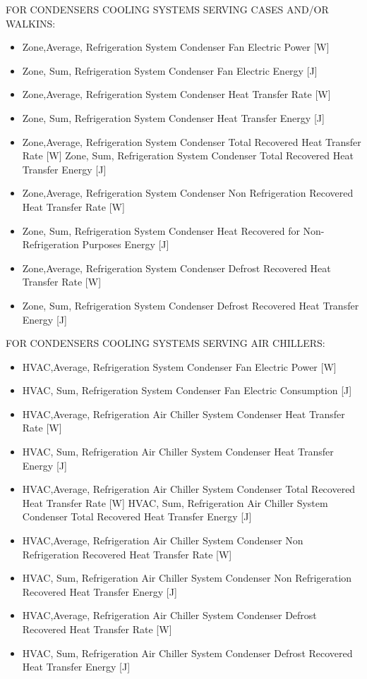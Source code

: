 FOR CONDENSERS COOLING SYSTEMS SERVING CASES AND/OR WALKINS:

\begin{itemize}
\item
  Zone,Average, Refrigeration System Condenser Fan Electric Power {[}W{]}
\item
  Zone, Sum, Refrigeration System Condenser Fan Electric Energy {[}J{]}
\item
  Zone,Average, Refrigeration System Condenser Heat Transfer Rate {[}W{]}
\item
  Zone, Sum, Refrigeration System Condenser Heat Transfer Energy {[}J{]}
\item
  Zone,Average, Refrigeration System Condenser Total Recovered Heat Transfer Rate {[}W{]} Zone, Sum, Refrigeration System Condenser Total Recovered Heat Transfer Energy {[}J{]}
\item
  Zone,Average, Refrigeration System Condenser Non Refrigeration Recovered Heat Transfer Rate {[}W{]}
\item
  Zone, Sum, Refrigeration System Condenser Heat Recovered for Non-Refrigeration Purposes Energy {[}J{]}
\item
  Zone,Average, Refrigeration System Condenser Defrost Recovered Heat Transfer Rate {[}W{]}
\item
  Zone, Sum, Refrigeration System Condenser Defrost Recovered Heat Transfer Energy {[}J{]}
\end{itemize}

FOR CONDENSERS COOLING SYSTEMS SERVING AIR CHILLERS:

\begin{itemize}
\item
  HVAC,Average, Refrigeration System Condenser Fan Electric Power {[}W{]}
\item
  HVAC, Sum, Refrigeration System Condenser Fan Electric Consumption {[}J{]}
\item
  HVAC,Average, Refrigeration Air Chiller System Condenser Heat Transfer Rate {[}W{]}
\item
  HVAC, Sum, Refrigeration Air Chiller System Condenser Heat Transfer Energy {[}J{]}
\item
  HVAC,Average, Refrigeration Air Chiller System Condenser Total Recovered Heat Transfer Rate {[}W{]} HVAC, Sum, Refrigeration Air Chiller System Condenser Total Recovered Heat Transfer Energy {[}J{]}
\item
  HVAC,Average, Refrigeration Air Chiller System Condenser Non Refrigeration Recovered Heat Transfer Rate {[}W{]}
\item
  HVAC, Sum, Refrigeration Air Chiller System Condenser Non Refrigeration Recovered Heat Transfer Energy {[}J{]}
\item
  HVAC,Average, Refrigeration Air Chiller System Condenser Defrost Recovered Heat Transfer Rate {[}W{]}
\item
  HVAC, Sum, Refrigeration Air Chiller System Condenser Defrost Recovered Heat Transfer Energy {[}J{]}
\end{itemize}

